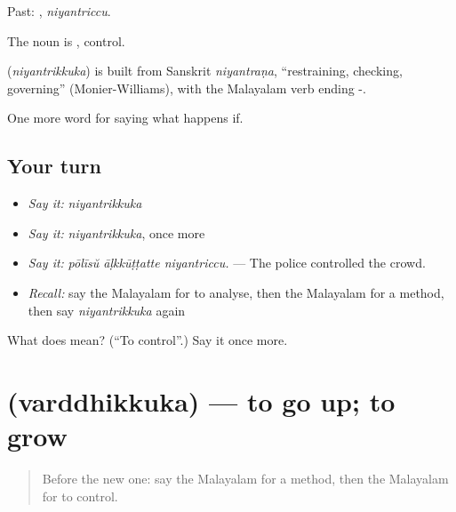 Past: , \emph{niyantriccu}.

The noun is , control.

\begin{cousinweb}
\textbf{} (\emph{niyantrikkuka}) is built from Sanskrit \emph{niyantraṇa}, \textquotedblleft{}restraining, checking, governing\textquotedblright{} (Monier-Williams), with the Malayalam verb ending -.
\end{cousinweb}

\begin{grammarlens}[title={What you've built}]
One more word for saying what happens if.
\end{grammarlens}

\subsection*{Your turn}
\begin{itemize}
\raggedright
  \item \emph{Say it:} \emph{niyantrikkuka}
  \item \emph{Say it:} \emph{niyantrikkuka}, once more
  \item \emph{Say it:} \emph{pōlīsŭ āḷkkūṭṭatte niyantriccu.} — The police controlled the crowd.
  \item \emph{Recall:} say the Malayalam for to analyse, then the Malayalam for a method, then say \emph{niyantrikkuka} again
\end{itemize}

\begin{tcolorbox}[breakable,colback=teal!4,colframe=teal!35!black,title={Before you move on}]
What does  mean? (\textquotedblleft{}To control\textquotedblright{}.) Say it once more.
\end{tcolorbox}
\section[\texorpdfstring{\ml{വർദ്ധിക്കുക} (varddhikkuka)}{വർദ്ധിക്കുക (varddhikkuka)}]{ (varddhikkuka) — to go up; to grow}

\label{lesson:ML-C449-varddhikkuka}



\begin{quote}
Before the new one: say the Malayalam for a method, then the Malayalam for to control.
\end{quote}


